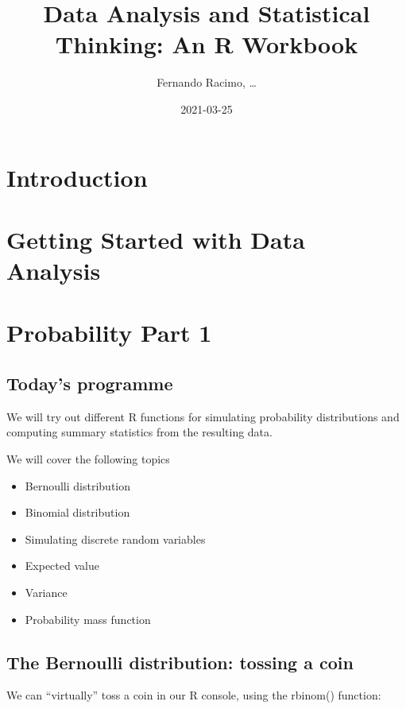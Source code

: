 \documentclass[
]{book}
\title{Data Analysis and Statistical Thinking: An R Workbook}
\author{Fernando Racimo, \ldots{}}
\date{2021-03-25}
\providecommand{\tightlist}{%
  \setlength{\itemsep}{0pt}\setlength{\parskip}{0pt}}
\begin{document}
\maketitle

{
\setcounter{tocdepth}{1}
\tableofcontents
}
\hypertarget{introduction}{%
\chapter{Introduction}\label{introduction}}

\hypertarget{intro}{%
\chapter{Getting Started with Data Analysis}\label{intro}}

\hypertarget{prob1}{%
\chapter{Probability Part 1}\label{prob1}}

\hypertarget{todays-programme}{%
\section{Today's programme}\label{todays-programme}}

We will try out different R functions for simulating probability distributions and computing summary statistics from the resulting data.

We will cover the following topics

\begin{itemize}
\tightlist
\item
  Bernoulli distribution
\item
  Binomial distribution
\item
  Simulating discrete random variables
\item
  Expected value
\item
  Variance
\item
  Probability mass function
\end{itemize}

\hypertarget{the-bernoulli-distribution-tossing-a-coin}{%
\section{The Bernoulli distribution: tossing a coin}\label{the-bernoulli-distribution-tossing-a-coin}}

We can ``virtually'' toss a coin in our R console, using the rbinom() function:
\end{document}
